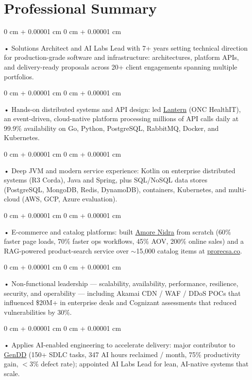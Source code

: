 \documentclass[10pt, letterpaper]{article}
\newenvironment{onecolentry}{
    \begin{adjustwidth}{
        0 cm + 0.00001 cm
    }{
        0 cm + 0.00001 cm
    }
}{
    \end{adjustwidth}
} %
\begin{document}
    \section{Professional Summary}
        \vspace{2 pt }
        \begin{onecolentry}
            • Solutions Architect and AI Labs Lead with 7+ years setting technical direction for production-grade software and infrastructure: architectures, platform APIs, and delivery-ready proposals across 20+ client engagements spanning multiple portfolios.
        \end{onecolentry}
        \begin{onecolentry}
            • Hands-on distributed systems and API design: led \href{https://lantern.healthit.gov/?tab=dashboard_tab}{Lantern} (ONC HealthIT), an event-driven, cloud-native platform processing millions of API calls daily at 99.9\% availability on Go, Python, PostgreSQL, RabbitMQ, Docker, and Kubernetes.
        \end{onecolentry}
        \begin{onecolentry}
            • Deep JVM and modern service experience: Kotlin on enterprise distributed systems (R3 Corda), Java and Spring, plus SQL/NoSQL data stores (PostgreSQL, MongoDB, Redis, DynamoDB), containers, Kubernetes, and multi-cloud (AWS, GCP, Azure evaluation).
        \end{onecolentry}
        \begin{onecolentry}
            • E-commerce and catalog platforms: built \href{https://amorenidra.com}{Amore Nidra} from scratch (60\% faster page loads, 70\% faster ops workflows, 45\% AOV, 200\% online sales) and a RAG-powered product-search service over $\sim$15,000 catalog items at \href{https://prorecsa.co}{prorecsa.co}.
        \end{onecolentry}
        \begin{onecolentry}
            • Non-functional leadership --- scalability, availability, performance, resilience, security, and operability --- including Akamai CDN / WAF / DDoS POCs that influenced \$20M+ in enterprise deals and Cognizant assessments that reduced vulnerabilities by 30\%.
        \end{onecolentry}
        \begin{onecolentry}
            • Applies AI-enabled engineering to accelerate delivery: major contributor to \href{https://hatchworks.com/generative-driven-development/}{GenDD} (150+ SDLC tasks, 347 AI hours reclaimed / month, 75\% productivity gain, $<$3\% defect rate); appointed AI Labs Lead for lean, AI-native systems that scale.
        \end{onecolentry}
\end{document}
